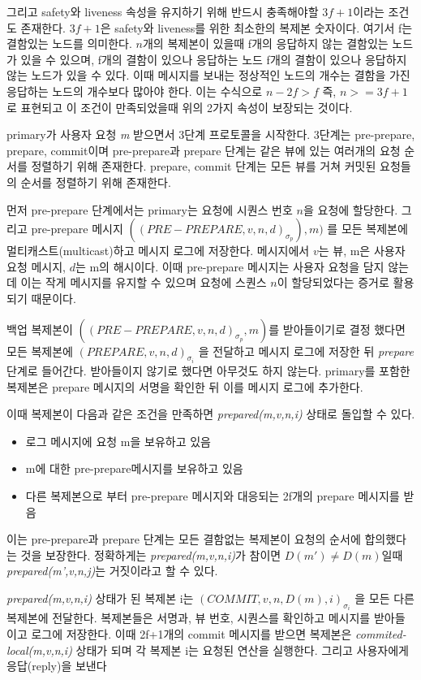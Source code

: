 \documentclass[table,smallextended]{svjour3}       %
\begin{document}
그리고 safety와 liveness 속성을 유지하기 위해 반드시 충족해야할 \(3f+1\)이라는 조건도 존재한다.
\(3f+1\)은 safety와 liveness를 위한 최소한의 복제본 숫자이다. 여기서 f는 결함있는 노드를 의미한다.
\(n\)개의 복제본이 있을때 f개의 응답하지 않는 결함있는 노드가 있을 수 있으며, f개의 결함이 있으나 응답하는 노드
f개의 결함이 있으나 응답하지 않는 노드가 있을 수 있다. 이때 메시지를 보내는 정상적인 노드의 개수는 결함을 가진
응답하는 노드의 개수보다 많아야 한다. 이는 수식으로 \(n-2f > f\) 즉, \(n >= 3f+1\)로 표현되고
이 조건이 만족되었을때 위의 2가지 속성이 보장되는 것이다.

primary가 사용자 요청 \textit{m} 받으면서 3단계 프로토콜을 시작한다.
3단계는 pre-prepare, prepare, commit이며 pre-prepare과 prepare 단계는
같은 뷰에 있는 여러개의 요청 순서를 정렬하기 위해 존재한다.
prepare, commit 단계는 모든 뷰를 거쳐 커밋된 요청들의 순서를 정렬하기 위해 존재한다.

먼저 pre-prepare 단계에서는 primary는 요청에 시퀀스 번호 \(n\)을 요청에 할당한다.
그리고 pre-prepare 메시지 \(((PRE-PREPARE,v,n,d)_{\sigma_{p}}),m)\)
를 모든 복제본에 멀티캐스트(multicast)하고 메시지 로그에 저장한다. 메시지에서 \(v\)는 뷰, m은 사용자 요청 메시지,
\(d\)는 m의 해시이다. 이때 pre-prepare 메시지는 사용자 요청을 담지 않는데 이는 작게 메시지를 유지할 수 있으며
요청에 스퀀스 \(n\)이 할당되었다는 증거로 활용되기 때문이다.

백업 복제본이 \(((PRE-PREPARE,v,n,d)_{\sigma_{p}},m)\)를 받아들이기로 결정 했다면 모든 복제본에
\((PREPARE,v,n,d)_{\sigma_{i}}\) 을 전달하고 메시지 로그에 저장한 뒤 \textit{prepare} 단계로 들어간다. 
받아들이지 않기로 했다면 아무것도 하지 않는다.
primary를 포함한 복제본은 prepare 메시지의 서명을 확인한 뒤 이를 메시지 로그에 추가한다.

이때 복제본이 다음과 같은 조건을 만족하면 \textit{prepared(m,v,n,i)} 상태로 돌입할 수 있다. 
\begin{itemize}
\item 로그 메시지에 요청 m을 보유하고 있음
\item m에 대한 pre-prepare메시지를 보유하고 있음
\item 다른 복제본으로 부터 pre-prepare 메시지와 대응되는 2f개의 prepare 메시지를 받음
\end{itemize}
이는 pre-prepare과 prepare 단계는 모든 결함없는 복제본이 요청의 순서에 합의했다는 것을 보장한다. 
정확하게는 \textit{prepared(m,v,n,i)}가 참이면 \(D(m') \neq D(m)\)일때 
\textit{prepared(m',v,n,j)}는 거짓이라고 할 수 있다. 

\textit{prepared(m,v,n,i)} 상태가 된 복제본 i는 \((COMMIT,v,n,D(m),i)_{\sigma_{i}}\) 을
모든 다른 복제본에 전달한다. 복제본들은 서명과, 뷰 번호, 시퀀스를 확인하고 메시지를 받아들이고
로그에 저장한다. 이때 2f+1개의 commit 메시지를 받으면 복제본은 \textit{commited-local(m,v,n,i)} 상태가 되며
각 복제본 i는 요청된 연산을 실행한다. 그리고 사용자에게 응답(reply)을 보낸다
\end{document}
